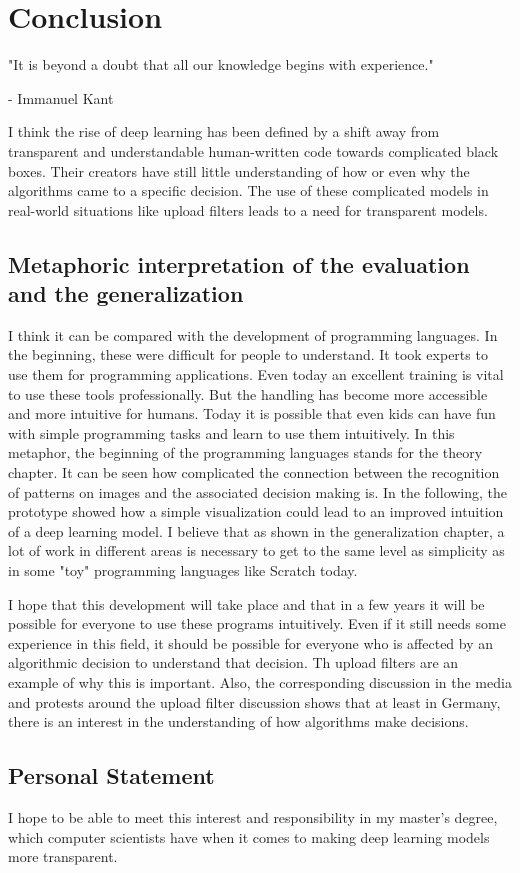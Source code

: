 
\chapter{Conclusion}
\epigraph{"It is beyond a doubt that all our knowledge begins with experience."}{- Immanuel Kant}
\label{ch:conclusion}


I think the rise of deep learning has been defined by a shift away from transparent and understandable human-written code towards complicated black boxes. Their creators have still little understanding of how or even why the algorithms came to a specific decision. The use of these complicated models in real-world situations like upload filters leads to a need for transparent models. 

\section{Metaphoric interpretation of the evaluation and the generalization}

I think it can be compared with the development of programming languages. In the beginning, these were difficult for people to understand. It took experts to use them for programming applications. Even today an excellent training is vital to use these tools professionally. But the handling has become more accessible and more intuitive for humans. Today it is possible that even kids can have fun with simple programming tasks and learn to use them intuitively. In this metaphor, the beginning of the programming languages stands for the theory chapter. It can be seen how complicated the connection between the recognition of patterns on images and the associated decision making is. In the following, the prototype showed how a simple visualization could lead to an improved intuition of a deep learning model. I believe that as shown in the generalization chapter, a lot of work in different areas is necessary to get to the same level as simplicity as in some "toy" programming languages like Scratch today. 

I hope that this development will take place and that in a few years it will be possible for everyone to use these programs intuitively. Even if it still needs some experience in this field, it should be possible for everyone who is affected by an algorithmic decision to understand that decision. Th upload filters are an example of why this is important. Also, the corresponding discussion in the media and protests around the upload filter discussion shows that at least in Germany, there is an interest in the understanding of how algorithms make decisions. 


\section{Personal Statement}

I hope to be able to meet this interest and responsibility in my master's degree, which computer scientists have when it comes to making deep learning models more transparent. 
